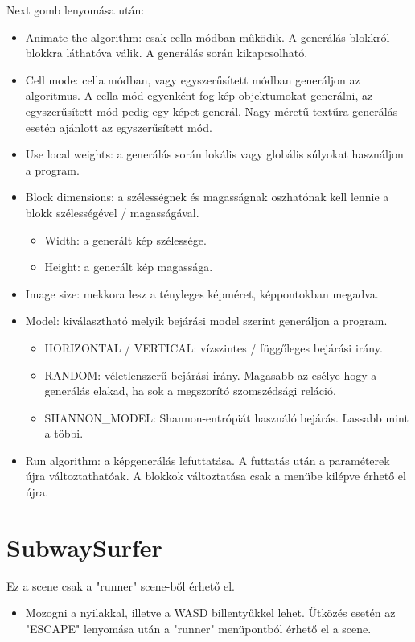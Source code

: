 Next gomb lenyomása után:
\begin{itemize}
    \label{item:WFC-hasznalat3}
        \item Animate the algorithm: csak cella módban működik. A generálás blokkról-blokkra láthatóva válik. A generálás során kikapcsolható.
        \item Cell mode: cella módban, vagy egyszerűsített módban generáljon az algoritmus. A cella mód egyenként fog kép objektumokat generálni, az egyszerűsített mód pedig egy képet generál. Nagy méretű textűra generálás esetén ajánlott az egyszerűsített mód.
        \item Use local weights: a generálás során lokális vagy globális súlyokat használjon a program.
        \item Block dimensions: a szélességnek és magasságnak oszhatónak kell lennie a blokk szélességével / magasságával.
        \begin{itemize}
            \item Width: a generált kép szélessége.
            \item Height: a generált kép magassága.
        \end{itemize}
        \item Image size: mekkora lesz a tényleges képméret, képpontokban megadva.
        \item Model: kiválasztható melyik bejárási model szerint generáljon a program.
        \begin{itemize}
            \item HORIZONTAL / VERTICAL: vízszintes / függőleges bejárási irány.
            \item RANDOM: véletlenszerű bejárási irány. Magasabb az esélye hogy a generálás elakad, ha sok a megszorító szomszédsági reláció.
            \item SHANNON\_MODEL: Shannon-entrópiát használó bejárás. Lassabb mint a többi.
        \end{itemize}
        \item Run algorithm: a képgenerálás lefuttatása. A futtatás után a paraméterek újra változtathatóak. A blokkok változtatása csak a menübe kilépve érhető el újra.
\end{itemize}
\section{SubwaySurfer}
Ez a scene csak a "runner" scene-ből érhető el.
\begin{itemize}
    \label{item:SubwaySurfer-hasznalat}
        \item Mozogni a nyilakkal, illetve a WASD billentyűkkel lehet. Ütközés esetén az "ESCAPE" lenyomása után a "runner" menüpontból érhető el a scene.
\end{itemize} 